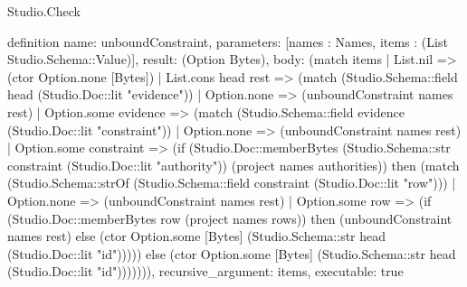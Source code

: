 \begin{lexlean}{Studio.Check}
\begin{semanticmodule}
definition{
  name: unboundConstraint,
  parameters: [names : Names, items : (List Studio.Schema::Value)],
  result: (Option Bytes),
  body: (match items
    | List.nil => (ctor Option.none [Bytes])
    | List.cons head rest => (match (Studio.Schema::field head (Studio.Doc::lit "evidence"))
      | Option.none => (unboundConstraint names rest)
      | Option.some evidence => (match (Studio.Schema::field evidence (Studio.Doc::lit "constraint"))
        | Option.none => (unboundConstraint names rest)
        | Option.some constraint => (if (Studio.Doc::memberBytes (Studio.Schema::str constraint (Studio.Doc::lit "authority")) (project names authorities)) then (match (Studio.Schema::strOf (Studio.Schema::field constraint (Studio.Doc::lit "row")))
          | Option.none => (unboundConstraint names rest)
          | Option.some row => (if (Studio.Doc::memberBytes row (project names rows)) then (unboundConstraint names rest) else (ctor Option.some [Bytes] (Studio.Schema::str head (Studio.Doc::lit "id"))))) else (ctor Option.some [Bytes] (Studio.Schema::str head (Studio.Doc::lit "id"))))))),
  recursive_argument: items,
  executable: true
}


\end{semanticmodule}
\end{lexlean}
